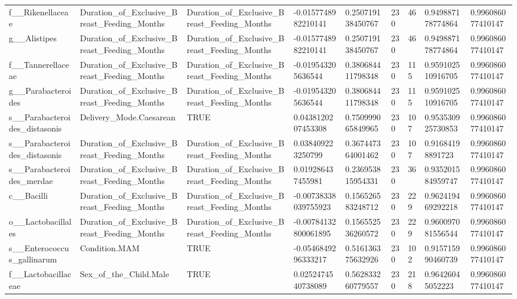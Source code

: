 \begin{longtable}{lllllllll}
f\_\_Rikenellaceae & Duration\_of\_Exclusive\_Breast\_Feeding\_Months & Duration\_of\_Exclusive\_Breast\_Feeding\_Months & -0.0157748982210141 & 0.250719138450767 & 230 & 46 & 0.949887178774864 & 0.996086077410147 \\
g\_\_Alistipes & Duration\_of\_Exclusive\_Breast\_Feeding\_Months & Duration\_of\_Exclusive\_Breast\_Feeding\_Months & -0.0157748982210141 & 0.250719138450767 & 230 & 46 & 0.949887178774864 & 0.996086077410147 \\
f\_\_Tannerellaceae & Duration\_of\_Exclusive\_Breast\_Feeding\_Months & Duration\_of\_Exclusive\_Breast\_Feeding\_Months & -0.019543205636544 & 0.380684411798348 & 230 & 115 & 0.959102510916705 & 0.996086077410147 \\
g\_\_Parabacteroides & Duration\_of\_Exclusive\_Breast\_Feeding\_Months & Duration\_of\_Exclusive\_Breast\_Feeding\_Months & -0.019543205636544 & 0.380684411798348 & 230 & 115 & 0.959102510916705 & 0.996086077410147 \\
s\_\_Parabacteroides\_distasonis & Delivery\_Mode.Caesarean & TRUE & 0.0438120207453308 & 0.750999065849965 & 230 & 107 & 0.953530925730853 & 0.996086077410147 \\
s\_\_Parabacteroides\_distasonis & Duration\_of\_Exclusive\_Breast\_Feeding\_Months & Duration\_of\_Exclusive\_Breast\_Feeding\_Months & 0.038409223250799 & 0.367447364001462 & 230 & 107 & 0.91684198891723 & 0.996086077410147 \\
s\_\_Parabacteroides\_merdae & Duration\_of\_Exclusive\_Breast\_Feeding\_Months & Duration\_of\_Exclusive\_Breast\_Feeding\_Months & 0.019286437455981 & 0.236953815954331 & 230 & 36 & 0.935201584959747 & 0.996086077410147 \\
c\_\_Bacilli & Duration\_of\_Exclusive\_Breast\_Feeding\_Months & Duration\_of\_Exclusive\_Breast\_Feeding\_Months & -0.00738338039755923 & 0.156526583248712 & 230 & 229 & 0.962419469292218 & 0.996086077410147 \\
o\_\_Lactobacillales & Duration\_of\_Exclusive\_Breast\_Feeding\_Months & Duration\_of\_Exclusive\_Breast\_Feeding\_Months & -0.00784132800061895 & 0.156552536260572 & 230 & 229 & 0.960097081556544 & 0.996086077410147 \\
s\_\_Enterococcus\_gallinarum & Condition.MAM & TRUE & -0.0546849296333217 & 0.516136375632926 & 230 & 102 & 0.915715990460739 & 0.996086077410147 \\
f\_\_Lactobacillaceae & Sex\_of\_the\_Child.Male & TRUE & 0.0252474540738089 & 0.562833260779557 & 230 & 218 & 0.96426045052223 & 0.996086077410147 \\

\end{longtable}
